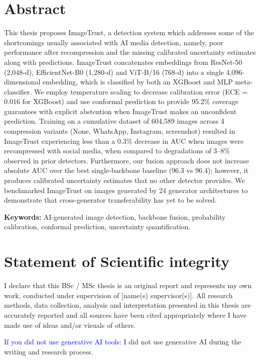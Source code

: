 \documentclass[12pt,a4paper]{book}
\theoremstyle{definition}
\theoremstyle{remark}
\begin{document}
\section*{Abstract}

This thesis proposes ImageTrust, a detection system which addresses some of the shortcomings usually associated with AI media detection, namely, poor performance after recompression and the missing calibrated uncertainty estimates along with predictions. ImageTrust concatenates embeddings from ResNet-50 (2,048-d), EfficientNet-B0 (1,280-d) and ViT-B/16 (768-d) into a single 4,096-dimensional embedding, which is classified by both an XGBoost and MLP meta-classifier. We employ temperature scaling to decrease calibration error (ECE = 0.016 for XGBoost) and use conformal prediction to provide 95.2\% coverage guarantees with explicit abstention when ImageTrust makes an unconfident prediction. Training on a cumulative dataset of 604,589 images across 4 compression variants (None, WhatsApp, Instagram, screenshot) resulted in ImageTrust experiencing less than a 0.3\% decrease in AUC when images were recompressed with social media, when compared to degradations of 3--8\% observed in prior detectors. Furthermore, our fusion approach does not increase absolute AUC over the best single-backbone baseline (96.3 vs 96.4); however, it produces calibrated uncertainty estimates that no other detector provides. We benchmarked ImageTrust on images generated by 24 generator architectures to demonstrate that cross-generator transferability has yet to be solved.

\noindent \textbf{Keywords:} AI-generated image detection, backbone fusion, probability calibration, conformal prediction, uncertainty quantification.



\newpage

\section*{Statement of Scientific integrity}

I declare that this BSc / MSc thesis is an original report and represents my own work, conducted under supervision of [name(s) supervisor(s)]. All research methods, data collection, analysis and interpretation presented in this thesis are accurately reported and all sources have been cited appropriately where I have made use of ideas and/or visuals of others.

\textcolor{blue}{If you did not use generative AI tools:} I did not use generative AI during the writing and research process.
\end{document}
